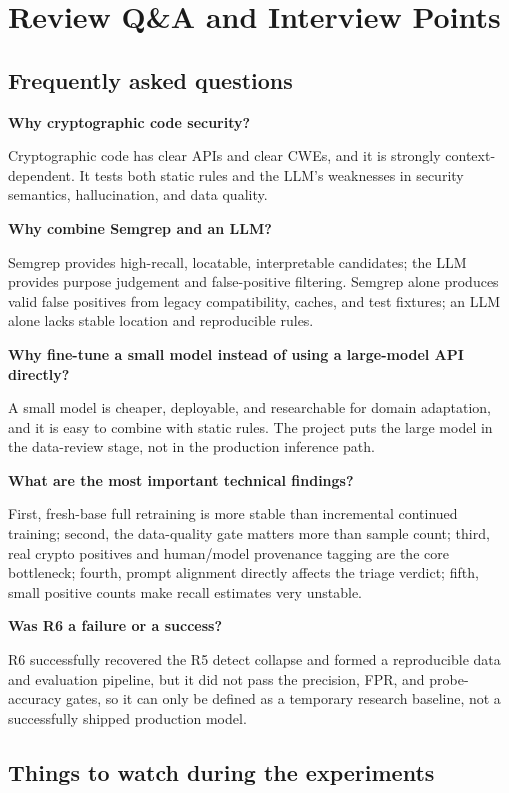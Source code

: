 \documentclass[11pt]{article}
\begin{document}
\section{Review Q\&A and Interview Points}

\subsection{Frequently asked questions}

\textbf{Why cryptographic code security?}

Cryptographic code has clear APIs and clear CWEs, and it is strongly context-dependent. It tests both static
rules and the LLM's weaknesses in security semantics, hallucination, and data quality.

\textbf{Why combine Semgrep and an LLM?}

Semgrep provides high-recall, locatable, interpretable candidates; the LLM provides purpose judgement and
false-positive filtering. Semgrep alone produces valid false positives from legacy compatibility, caches, and
test fixtures; an LLM alone lacks stable location and reproducible rules.

\textbf{Why fine-tune a small model instead of using a large-model API directly?}

A small model is cheaper, deployable, and researchable for domain adaptation, and it is easy to combine with
static rules. The project puts the large model in the data-review stage, not in the production inference path.

\textbf{What are the most important technical findings?}

First, fresh-base full retraining is more stable than incremental continued training; second, the data-quality
gate matters more than sample count; third, real crypto positives and human/model provenance tagging are the
core bottleneck; fourth, prompt alignment directly affects the triage verdict; fifth, small positive counts
make recall estimates very unstable.

\textbf{Was R6 a failure or a success?}

R6 successfully recovered the R5 detect collapse and formed a reproducible data and evaluation pipeline, but
it did not pass the precision, FPR, and probe-accuracy gates, so it can only be defined as a temporary research
baseline, not a successfully shipped production model.

\subsection{Things to watch during the experiments}
\end{document}
